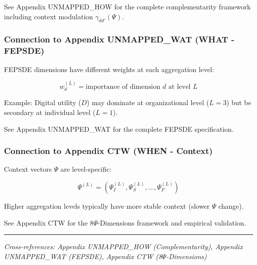 See Appendix UNMAPPED_HOW for the complete complementarity framework including context 
modulation $\gamma_{dd'}(\Psi)$.

\subsubsection{Connection to Appendix UNMAPPED_WAT (WHAT - FEPSDE)}

FEPSDE dimensions have different weights at each aggregation level:

\begin{equation}
w_d^{(L)} = \text{importance of dimension } d \text{ at level } L
\end{equation}

Example: Digital utility ($D$) may dominate at organizational level ($L=3$) 
but be secondary at individual level ($L=1$).

See Appendix UNMAPPED_WAT for the complete FEPSDE specification.

\subsubsection{Connection to Appendix CTW (WHEN - Context)}

Context vectors $\Psi$ are level-specific:

\begin{equation}
\Psi^{(L)} = (\Psi_I^{(L)}, \Psi_S^{(L)}, \ldots, \Psi_F^{(L)})
\end{equation}

Higher aggregation levels typically have more stable context (slower $\Psi$ change).

See Appendix CTW for the 8$\Psi$-Dimensions framework and empirical validation.

\vspace{0.5em}
\hrule
\vspace{0.5em}
\noindent\textit{Cross-references: Appendix UNMAPPED_HOW (Complementarity), 
Appendix UNMAPPED_WAT (FEPSDE), Appendix CTW (8$\Psi$-Dimensions)}

